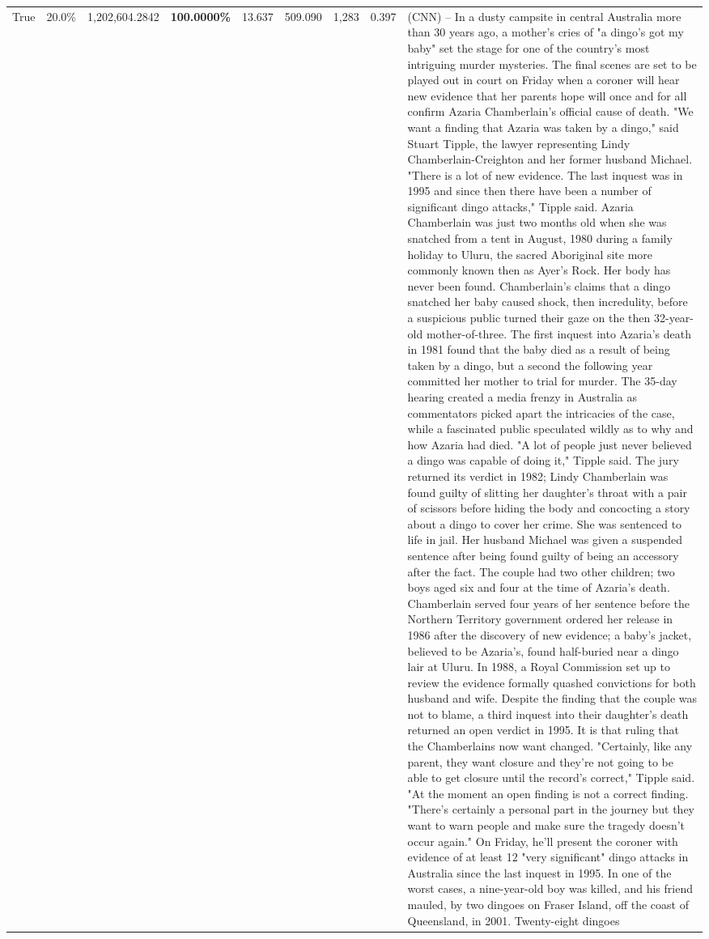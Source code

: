 \begin{table}[H]
\begin{tabular}{lllrlllll}
True & 20.0\% & 1,202,604.2842 & \bfseries \color{red} 100.0000\% & 13.637 & 509.090 & 1,283 & 0.397 & (CNN) -- In a dusty campsite in central Australia more than 30 years ago, a mother's cries of "a dingo's got my baby" set the stage for one of the country's most intriguing murder mysteries. The final scenes are set to be played out in court on Friday when a coroner will hear new evidence that her parents hope will once and for all confirm Azaria Chamberlain's official cause of death. "We want a finding that Azaria was taken by a dingo," said Stuart Tipple, the lawyer representing Lindy Chamberlain-Creighton and her former husband Michael. "There is a lot of new evidence. The last inquest was in 1995 and since then there have been a number of significant dingo attacks," Tipple said. Azaria Chamberlain was just two months old when she was snatched from a tent in August, 1980 during a family holiday to Uluru, the sacred Aboriginal site more commonly known then as Ayer's Rock. Her body has never been found. Chamberlain's claims that a dingo snatched her baby caused shock, then incredulity, before a suspicious public turned their gaze on the then 32-year-old mother-of-three. The first inquest into Azaria's death in 1981 found that the baby died as a result of being taken by a dingo, but a second the following year committed her mother to trial for murder. The 35-day hearing created a media frenzy in Australia as commentators picked apart the intricacies of the case, while a fascinated public speculated wildly as to why and how Azaria had died. "A lot of people just never believed a dingo was capable of doing it," Tipple said. The jury returned its verdict in 1982; Lindy Chamberlain was found guilty of slitting her daughter's throat with a pair of scissors before hiding the body and concocting a story about a dingo to cover her crime. She was sentenced to life in jail. Her husband Michael was given a suspended sentence after being found guilty of being an accessory after the fact. The couple had two other children; two boys aged six and four at the time of Azaria's death. Chamberlain served four years of her sentence before the Northern Territory government ordered her release in 1986 after the discovery of new evidence; a baby's jacket, believed to be Azaria's, found half-buried near a dingo lair at Uluru. In 1988, a Royal Commission set up to review the evidence formally quashed convictions for both husband and wife. Despite the finding that the couple was not to blame, a third inquest into their daughter's death returned an open verdict in 1995. It is that ruling that the Chamberlains now want changed. "Certainly, like any parent, they want closure and they're not going to be able to get closure until the record's correct," Tipple said. "At the moment an open finding is not a correct finding. "There's certainly a personal part in the journey but they want to warn people and make sure the tragedy doesn't occur again." On Friday, he'll present the coroner with evidence of at least 12 "very significant" dingo attacks in Australia since the last inquest in 1995. In one of the worst cases, a nine-year-old boy was killed, and his friend mauled, by two dingoes on Fraser Island, off the coast of Queensland, in 2001. Twenty-eight dingoes 
\end{tabular}
\end{table}
